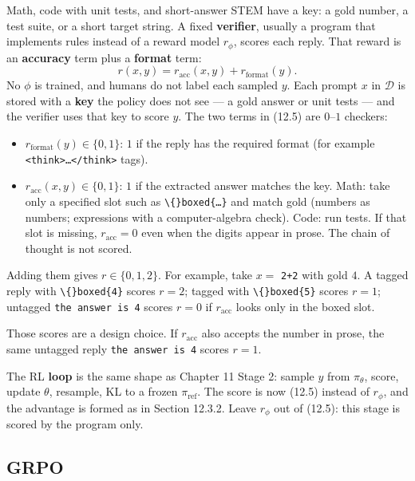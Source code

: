 Math, code with unit tests, and short-answer STEM have a key: a gold number, a test suite, or a short target string. A fixed \textbf{verifier}, usually a program that implements rules instead of a reward model $r_\phi$, scores each reply. That reward is an \textbf{accuracy} term plus a \textbf{format} term: \begin{equation}
r(x,y)=r_{\mathrm{acc}}(x,y)+r_{\mathrm{format}}(y).
\tag{12.5}
\end{equation} No $\phi$ is trained, and humans do not label each sampled $y$. Each prompt $x$ in $\mathcal{D}$ is stored with a \textbf{key} the policy does not see --- a gold answer or unit tests --- and the verifier uses that key to score $y$. The two terms in (12.5) are $0$--$1$ checkers:

\begin{itemize}
\item $r_{\mathrm{format}}(y)\in\{0,1\}$: $1$ if the reply has the required format (for example \texttt{<think>…</think>} tags).
\item $r_{\mathrm{acc}}(x,y)\in\{0,1\}$: $1$ if the extracted answer matches the key. Math: take only a specified slot such as \texttt{\textbackslash\{\}boxed\{…\}} and match gold (numbers as numbers; expressions with a computer-algebra check). Code: run tests. If that slot is missing, $r_{\mathrm{acc}}=0$ even when the digits appear in prose. The chain of thought is not scored.
\end{itemize}
Adding them gives $r\in\{0,1,2\}$. For example, take $x=$ \texttt{2+2} with gold $4$. A tagged reply with \texttt{\textbackslash\{\}boxed\{4\}} scores $r=2$; tagged with \texttt{\textbackslash\{\}boxed\{5\}} scores $r=1$; untagged \texttt{the answer is 4} scores $r=0$ if $r_{\mathrm{acc}}$ looks only in the boxed slot.

Those scores are a design choice. If $r_{\mathrm{acc}}$ also accepts the number in prose, the same untagged reply \texttt{the answer is 4} scores $r=1$.

The RL \textbf{loop} is the same shape as Chapter 11 Stage 2: sample $y$ from $\pi_\theta$, score, update $\theta$, resample, KL to a frozen $\pi_{\mathrm{ref}}$. The score is now (12.5) instead of $r_\phi$, and the advantage is formed as in Section 12.3.2. Leave $r_\phi$ out of (12.5): this stage is scored by the program only.

\subsection{GRPO}

